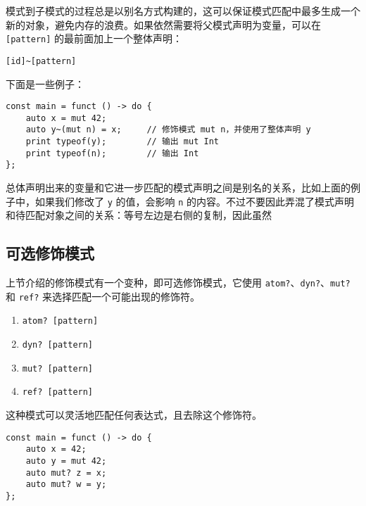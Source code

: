 模式到子模式的过程总是以别名方式构建的，这可以保证模式匹配中最多生成一个新的对象，避免内存的浪费。如果依然需要将父模式声明为变量，可以在 \lstinline![pattern]! 的最前面加上一个整体声明：

\begin{grammar} \label{grm:total-declaration}
    \lstinline![id]~[pattern]!
\end{grammar}

下面是一些例子：

\begin{lstlisting}
const main = funct () -> do {
    auto x = mut 42;
    auto y~(mut n) = x;     // 修饰模式 mut n，并使用了整体声明 y
    print typeof(y);        // 输出 mut Int
    print typeof(n);        // 输出 Int
};
\end{lstlisting}

总体声明出来的变量和它进一步匹配的模式声明之间是别名的关系，比如上面的例子中，如果我们修改了 \lstinline!y! 的值，会影响 \lstinline!n! 的内容。不过不要因此弄混了模式声明和待匹配对象之间的关系：等号左边是右侧的复制，因此虽然

\subsection{可选修饰模式}

上节介绍的修饰模式有一个变种，即可选修饰模式，它使用 \lstinline!atom?!、\lstinline!dyn?!、\lstinline!mut?! 和 \lstinline!ref?! 来选择匹配一个可能出现的修饰符。

\begin{grammar} \label{grm:optional-qualifier-pattern}
\begin{enumerate}
	\item \lstinline!atom? [pattern]!
	\item \lstinline!dyn? [pattern]!
	\item \lstinline!mut? [pattern]!
	\item \lstinline!ref? [pattern]!
\end{enumerate}
\end{grammar}

这种模式可以灵活地匹配任何表达式，且去除这个修饰符。

\begin{minipage}[c]{0.95\textwidth}
\vspace{1.0em}
\begin{lstlisting}
const main = funct () -> do {
    auto x = 42;
    auto y = mut 42;
    auto mut? z = x;
    auto mut? w = y;
};
\end{lstlisting}
\end{minipage}

